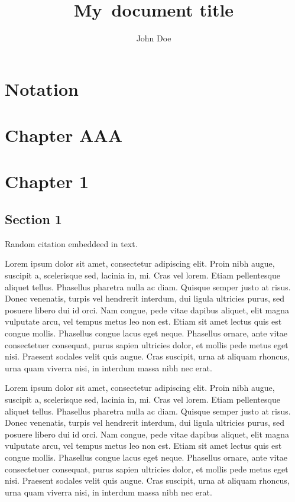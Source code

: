 \documentclass[12pt,a4paper,oneside]{book}
\title{My~document title}
\author{John Doe}
\begin{document}
  
  \frontmatter
  \maketitle
  
  \tableofcontents
  
  \clearpage %
  \chapter*{Notation}
  \markright{}
  
  \chapter{Chapter AAA}

  \mainmatter
  \chapter{Chapter 1}
  
  \section{Section 1}
  
  Random citation \cite{DUMMY:1} embeddeed in text.
  
  Lorem ipsum dolor sit amet, consectetur adipiscing elit. Proin nibh augue, suscipit a, scelerisque sed, lacinia in, mi. Cras vel lorem. Etiam pellentesque aliquet tellus. Phasellus pharetra nulla ac diam. Quisque semper justo at risus. Donec venenatis, turpis vel hendrerit interdum, dui ligula ultricies purus, sed posuere libero dui id orci. Nam congue, pede vitae dapibus aliquet, elit magna vulputate arcu, vel tempus metus leo non est. Etiam sit amet lectus quis est congue mollis. Phasellus congue lacus eget neque. Phasellus ornare, ante vitae consectetuer consequat, purus sapien ultricies dolor, et mollis pede metus eget nisi. Praesent sodales velit quis augue. Cras suscipit, urna at aliquam rhoncus, urna quam viverra nisi, in interdum massa nibh nec erat.
  
  Lorem ipsum dolor sit amet, consectetur adipiscing elit. Proin nibh augue, suscipit a, scelerisque sed, lacinia in, mi. Cras vel lorem. Etiam pellentesque aliquet tellus. Phasellus pharetra nulla ac diam. Quisque semper justo at risus. Donec venenatis, turpis vel hendrerit interdum, dui ligula ultricies purus, sed posuere libero dui id orci. Nam congue, pede vitae dapibus aliquet, elit magna vulputate arcu, vel tempus metus leo non est. Etiam sit amet lectus quis est congue mollis. Phasellus congue lacus eget neque. Phasellus ornare, ante vitae consectetuer consequat, purus sapien ultricies dolor, et mollis pede metus eget nisi. Praesent sodales velit quis augue. Cras suscipit, urna at aliquam rhoncus, urna quam viverra nisi, in interdum massa nibh nec erat.
  
\end{document}
